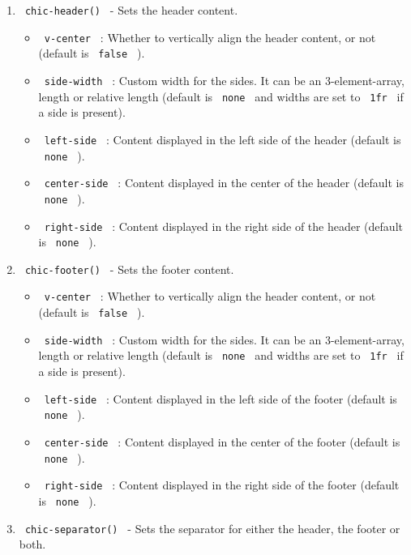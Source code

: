 \begin{enumerate}
\tightlist
\item
  \texttt{\ chic-header()\ } - Sets the header content.

  \begin{itemize}
  \tightlist
  \item
    \texttt{\ v-center\ } : Whether to vertically align the header
    content, or not (default is \texttt{\ false\ } ).
  \item
    \texttt{\ side-width\ } : Custom width for the sides. It can be an
    3-element-array, length or relative length (default is
    \texttt{\ none\ } and widths are set to \texttt{\ 1fr\ } if a side
    is present).
  \item
    \texttt{\ left-side\ } : Content displayed in the left side of the
    header (default is \texttt{\ none\ } ).
  \item
    \texttt{\ center-side\ } : Content displayed in the center of the
    header (default is \texttt{\ none\ } ).
  \item
    \texttt{\ right-side\ } : Content displayed in the right side of the
    header (default is \texttt{\ none\ } ).
  \end{itemize}
\item
  \texttt{\ chic-footer()\ } - Sets the footer content.

  \begin{itemize}
  \tightlist
  \item
    \texttt{\ v-center\ } : Whether to vertically align the header
    content, or not (default is \texttt{\ false\ } ).
  \item
    \texttt{\ side-width\ } : Custom width for the sides. It can be an
    3-element-array, length or relative length (default is
    \texttt{\ none\ } and widths are set to \texttt{\ 1fr\ } if a side
    is present).
  \item
    \texttt{\ left-side\ } : Content displayed in the left side of the
    footer (default is \texttt{\ none\ } ).
  \item
    \texttt{\ center-side\ } : Content displayed in the center of the
    footer (default is \texttt{\ none\ } ).
  \item
    \texttt{\ right-side\ } : Content displayed in the right side of the
    footer (default is \texttt{\ none\ } ).
  \end{itemize}
\item
  \texttt{\ chic-separator()\ } - Sets the separator for either the
  header, the footer or both.


\end{enumerate}
